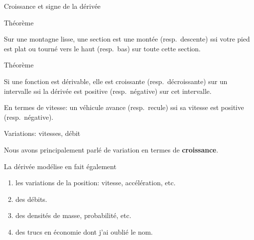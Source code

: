 \documentclass{beamer}
\begin{document}
\begin{frame}
    {Croissance et signe de la dérivée}

    \begin{exampleblock}
        {Théorème}

        Sur une montagne lisse, une section est une montée (resp.\ descente) ssi votre pied est plat ou tourné vers le haut (resp.\ bas) sur toute cette section.
    \end{exampleblock}
    \pause{}

    \begin{alertblock}
        {Théorème}

        Si une fonction est dérivable, elle est croissante (resp.\ décroissante) sur un intervalle ssi la dérivée est positive (resp.\ négative) sur cet intervalle.
    \end{alertblock}

    \pause{}
    En termes de vitesse: un véhicule avance (resp.\ recule) ssi sa vitesse est positive (resp.\ négative).
\end{frame}

\begin{frame}
    {Variations: vitesses, débit}

    Nous avons principalement parlé de variation en termes de \textbf{croissance}.

    La dérivée modélise en fait également
    \begin{enumerate}
        \item les variations de la position: vitesse, accélération, etc.
            \pause{}
        \item des débits.
            \pause{}
        \item des densités de masse, probabilité, etc.
            \pause{}
        \item des trucs en économie dont j'ai oublié le nom.
    \end{enumerate}
\end{frame}
\end{document}

